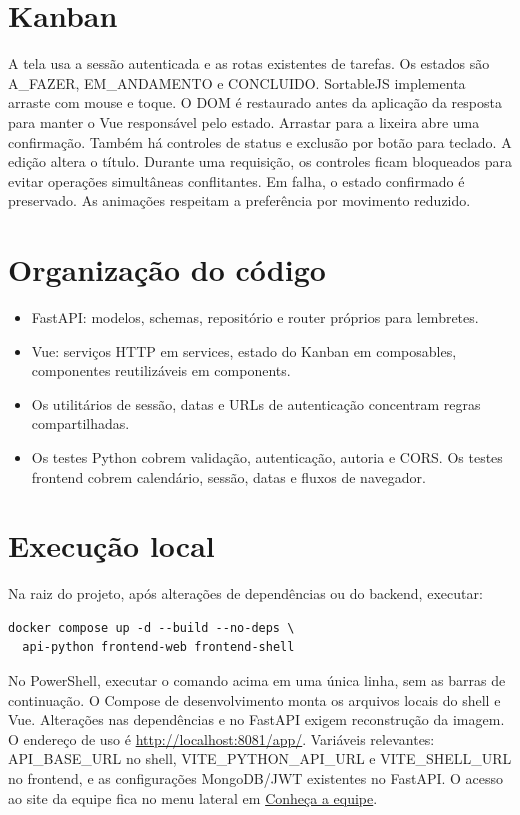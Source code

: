 \documentclass[11pt,a4paper]{article}
\begin{document}
\section{Kanban}
A tela usa a sessão autenticada e as rotas existentes de tarefas.
Os estados são A\_FAZER, EM\_ANDAMENTO e CONCLUIDO.
SortableJS implementa arraste com mouse e toque. O DOM é restaurado antes da aplicação da resposta para manter o Vue responsável pelo estado.
Arrastar para a lixeira abre uma confirmação. Também há controles de status e exclusão por botão para teclado.
A edição altera o título. Durante uma requisição, os controles ficam bloqueados para evitar operações simultâneas conflitantes. Em falha, o estado confirmado é preservado.
As animações respeitam a preferência por movimento reduzido.

\section{Organização do código}
\begin{itemize}
\item FastAPI: modelos, schemas, repositório e router próprios para lembretes.
\item Vue: serviços HTTP em services, estado do Kanban em composables, componentes reutilizáveis em components.
\item Os utilitários de sessão, datas e URLs de autenticação concentram regras compartilhadas.
\item Os testes Python cobrem validação, autenticação, autoria e CORS. Os testes frontend cobrem calendário, sessão, datas e fluxos de navegador.
\end{itemize}

\section{Execução local}
Na raiz do projeto, após alterações de dependências ou do backend, executar:
\begin{verbatim}
docker compose up -d --build --no-deps \
  api-python frontend-web frontend-shell
\end{verbatim}
No PowerShell, executar o comando acima em uma única linha, sem as barras de continuação.
O Compose de desenvolvimento monta os arquivos locais do shell e Vue. Alterações nas dependências e no FastAPI exigem reconstrução da imagem.
O endereço de uso é \url{http://localhost:8081/app/}.
Variáveis relevantes: API\_BASE\_URL no shell, VITE\_PYTHON\_API\_URL e VITE\_SHELL\_URL no frontend, e as configurações MongoDB/JWT existentes no FastAPI.
O acesso ao site da equipe fica no menu lateral em \href{https://teste2234234.my.canva.site/in-cio}{Conheça a equipe}.
\end{document}
